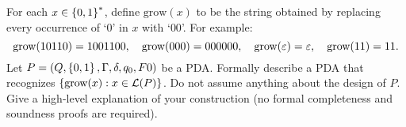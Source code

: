 \begin{problem}
  For each $x \in \left\{0, 1\right\}^*$, define $\text{grow}(x)$ to be the string
  obtained by replacing every occurrence of `$0$' in $x$ with `$00$'.
  For example:
  \[ 
          \text{grow}(10110) = 1001100,
    \quad \text{grow}(000) = 000000,
    \quad \text{grow}(\varepsilon) = \varepsilon,
    \quad \text{grow}(11) = 11.
  \]
  Let $P = (Q, \left\{0, 1\right\}, \Gamma, \delta, q_0, F0)$ be a PDA.
  Formally describe a PDA that recognizes $\left\{\text{grow}(x) : x \in \mathcal{L}(P)\right\}$.
  Do not assume anything about the design of $P$. \\
  Give a high-level explanation of your construction
  (no formal completeness and soundness proofs are required).
\end{problem}
\begin{Answer}
  
\end{Answer}
